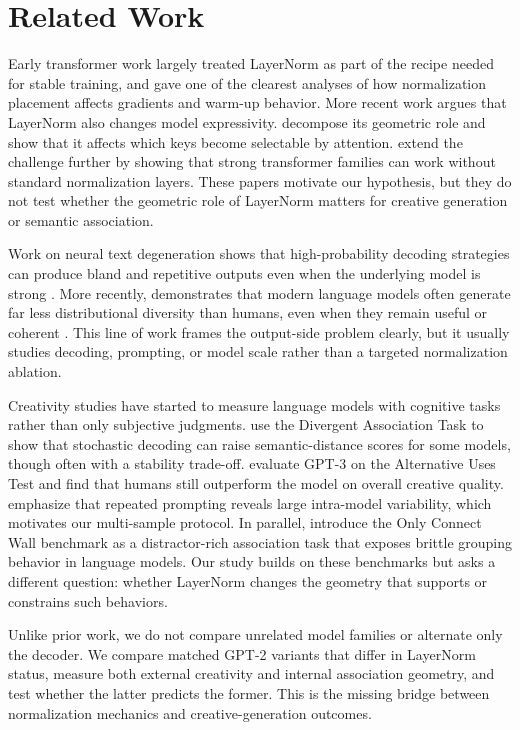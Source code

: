 \section{Related Work}
\label{sec:related_work}

 Early transformer work largely treated LayerNorm as part of the recipe needed for stable training, and \citet{xiong2020layernorm} gave one of the clearest analyses of how normalization placement affects gradients and warm-up behavior. More recent work argues that LayerNorm also changes model expressivity. \citet{brody2023expressivity} decompose its geometric role and show that it affects which keys become selectable by attention. \citet{zhu2025transformers} extend the challenge further by showing that strong transformer families can work without standard normalization layers. These papers motivate our hypothesis, but they do not test whether the geometric role of LayerNorm matters for creative generation or semantic association.

 Work on neural text degeneration shows that high-probability decoding strategies can produce bland and repetitive outputs even when the underlying model is strong \citep{holtzman2020curious}. More recently, \noveltybench demonstrates that modern language models often generate far less distributional diversity than humans, even when they remain useful or coherent \citep{zhang2025noveltybench}. This line of work frames the output-side problem clearly, but it usually studies decoding, prompting, or model scale rather than a targeted normalization ablation.

 Creativity studies have started to measure language models with cognitive tasks rather than only subjective judgments. \citet{chen2023creativity} use the Divergent Association Task to show that stochastic decoding can raise semantic-distance scores for some models, though often with a stability trade-off. \citet{stevenson2022gpt3} evaluate GPT-3 on the Alternative Uses Test and find that humans still outperform the model on overall creative quality. \citet{haase2025creativity} emphasize that repeated prompting reveals large intra-model variability, which motivates our multi-sample protocol. In parallel, \citet{naeini2023ocw} introduce the Only Connect Wall benchmark as a distractor-rich association task that exposes brittle grouping behavior in language models. Our study builds on these benchmarks but asks a different question: whether LayerNorm changes the geometry that supports or constrains such behaviors.

 Unlike prior work, we do not compare unrelated model families or alternate only the decoder. We compare matched GPT-2 variants that differ in LayerNorm status, measure both external creativity and internal association geometry, and test whether the latter predicts the former. This is the missing bridge between normalization mechanics and creative-generation outcomes.
